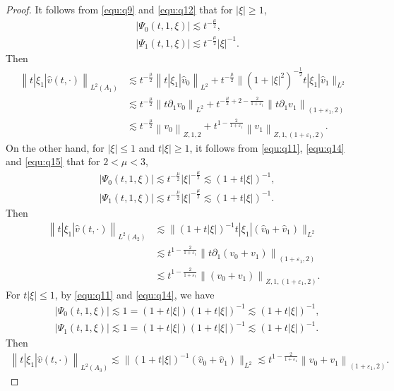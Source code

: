 \documentclass[11pt,twoside]{article}
\newcommand{\p}{\partial}
\newcommand{\f}{\frac}
\theoremstyle{plain}
\theoremstyle{definition}
\theoremstyle{remark}
\numberwithin{equation}{section}
\begin{document}
\begin{proof}
It follows from  \eqref{equ:q9} and  \eqref{equ:q12} that for $|\xi|\geq1$,
$$
\begin{aligned}
& \left|\Psi_0(t, 1,\xi)\right| \lesssim t^{-\frac{\mu}{2}}, \\
& \left|\Psi_1(t, 1, \xi)\right|  \lesssim t^{-\frac{\mu}{2}}|\xi|^{-1}.
\end{aligned}
$$
Then
\begin{equation}\label{equ:q65}
\begin{aligned}
\left\|t|\xi_1|\hat{v}(t, \cdot)\right\|_{L^2(A_1)} & \lesssim t^{-\frac{\mu}{2}}\left\|t|\xi_1|\hat{v}_{0}\right\|_{L^{2}}+t^{-\f{\mu}{2}} \|(1+|\xi|^2)^{-\f{1}{2}}t|\xi_1|\hat{v}_{1}\|_{L^{2}}\\
& \lesssim t^{-\frac{\mu}{2}}\left\|t\p_1v_{0}\right\|_{L^{2}}+ t^{-\f{\mu}{2}+2-\f{2}{1+\varepsilon_1}}\left\|t\p_1v_{1}\right\|_{(1+\varepsilon_1, 2)}\\
& \lesssim t^{-\frac{\mu}{2}}\left\|v_{0}\right\|_{Z, 1, 2}+ t^{1-\f{2}{1+\varepsilon_1}}\left\|v_{1}\right\|_{Z, 1, (1+\varepsilon_1, 2)}.
\end{aligned}
\end{equation}
On the other hand, for $|\xi|\leq1$ and $t|\xi|\geq1$, it follows from \eqref{equ:q11}, \eqref{equ:q14} and \eqref{equ:q15} that for $2<\mu<3$,
$$
\begin{aligned}
& \left|\Psi_0(t, 1,\xi)\right| \lesssim t^{-\frac{\mu}{2}}|\xi|^{-\frac{\mu}{2}}\lesssim (1+t|\xi|)^{-1} ,\\
& \left|\Psi_1(t, 1, \xi)\right|  \lesssim t^{-\frac{\mu}{2}}|\xi|^{-\frac{\mu}{2}}\lesssim (1+t|\xi|)^{-1}.
\end{aligned}
$$
Then
\begin{equation}\label{equ:q67}
\begin{aligned}
\left\|t|\xi_1|\hat{v}(t, \cdot)\right\|_{L^2(A_2)}&\lesssim  \|(1+t|\xi|)^{-1}t|\xi_1|(\hat{v}_{0}+\hat{v}_{1})\|_{L^{2}}\\
& \lesssim t^{1-\f{2}{1+\varepsilon_1}}\left\|t\p_1(v_0+v_{1})\right\|_{(1+\varepsilon_1, 2)}\\
& \lesssim  t^{1-\f{2}{1+\varepsilon_1}}\left\|(v_0+v_{1})\right\|_{Z, 1, (1+\varepsilon_1, 2)}.
\end{aligned}
\end{equation}
For $t|\xi|\leq1$, by \eqref{equ:q11} and \eqref{equ:q14}, we have
$$
\begin{aligned}
& \left|\Psi_0(t, 1,\xi)\right| \lesssim 1= (1+t|\xi|)(1+t|\xi|)^{-1}\lesssim  (1+t|\xi|)^{-1},\\
& \left|\Psi_1(t, 1, \xi)\right|  \lesssim 1= (1+t|\xi|)(1+t|\xi|)^{-1}\lesssim  (1+t|\xi|)^{-1}.
\end{aligned}
$$
Then
\begin{equation}\label{equ:q68}
\begin{aligned}
\left\|t|\xi_1|\hat{v}(t, \cdot)\right\|_{L^2(A_3)}\lesssim  \|(1+t|\xi|)^{-1}(\hat{v}_{0}+\hat{v}_{1})\|_{L^{2}}
\lesssim t^{1-\f{2}{1+\varepsilon_1}}\left\|v_0+v_{1}\right\|_{(1+\varepsilon_1, 2)}.
\end{aligned}
\end{equation}


\end{proof}
\end{document}
